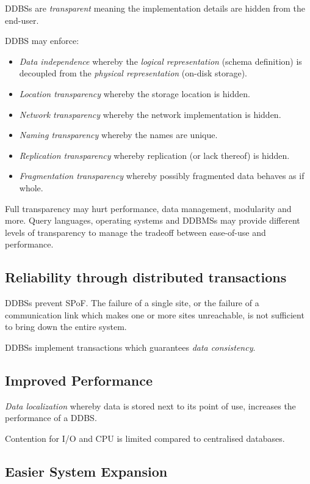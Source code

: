 \documentclass[12pt]{article}
\begin{document}
DDBSs are \textit{transparent} meaning the implementation details are hidden from the end-user.

DDBS may enforce:
\begin{itemize}
	\item \textit{Data independence} whereby the \textit{logical representation} (schema definition) is decoupled from the \textit{physical representation} (on-disk storage).
	\item \textit{Location transparency} whereby the storage location is hidden.
	\item \textit{Network transparency} whereby the network implementation is hidden.
	\item \textit{Naming transparency} whereby the names are unique.
	\item \textit{Replication transparency} whereby replication (or lack thereof) is hidden.
	\item \textit{Fragmentation transparency} whereby possibly fragmented data behaves as if whole.	
\end{itemize}
Full transparency may hurt performance, data management, modularity and more. Query languages, operating systems and DDBMSs may provide different levels of transparency to manage the tradeoff between ease-of-use and performance.

\subsection{Reliability through distributed transactions}

DDBSs prevent SPoF. The failure of a single site, or the failure of a communication link which makes one or more sites unreachable, is not sufficient to bring down the entire system.

DDBSs implement transactions which guarantees \textit{data consistency}.

\subsection{Improved Performance}

\textit{Data localization} whereby data is stored next to its point of use, increases the performance of a DDBS.

Contention for I/O and CPU is limited compared to centralised databases.

\subsection{Easier System Expansion}
\end{document}
